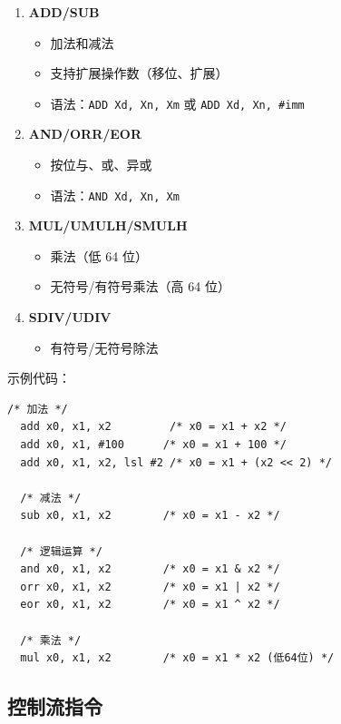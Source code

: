 
\begin{enumerate}
  \item \textbf{ADD/SUB}
    \begin{itemize}
      \item 加法和减法
      \item 支持扩展操作数（移位、扩展）
      \item 语法：\texttt{ADD Xd, Xn, Xm} 或 \texttt{ADD Xd, Xn, \#imm}
    \end{itemize}

  \item \textbf{AND/ORR/EOR}
    \begin{itemize}
      \item 按位与、或、异或
      \item 语法：\texttt{AND Xd, Xn, Xm}
    \end{itemize}

  \item \textbf{MUL/UMULH/SMULH}
    \begin{itemize}
      \item 乘法（低 64 位）
      \item 无符号/有符号乘法（高 64 位）
    \end{itemize}

  \item \textbf{SDIV/UDIV}
    \begin{itemize}
      \item 有符号/无符号除法
    \end{itemize}
\end{enumerate}

示例代码：
\begin{lstlisting}[language={[ARM]Assembler}]
  /* 加法 */
  add x0, x1, x2         /* x0 = x1 + x2 */
  add x0, x1, #100      /* x0 = x1 + 100 */
  add x0, x1, x2, lsl #2 /* x0 = x1 + (x2 << 2) */

  /* 减法 */
  sub x0, x1, x2        /* x0 = x1 - x2 */

  /* 逻辑运算 */
  and x0, x1, x2        /* x0 = x1 & x2 */
  orr x0, x1, x2        /* x0 = x1 | x2 */
  eor x0, x1, x2        /* x0 = x1 ^ x2 */

  /* 乘法 */
  mul x0, x1, x2        /* x0 = x1 * x2 (低64位) */
\end{lstlisting}

\subsection{控制流指令}

